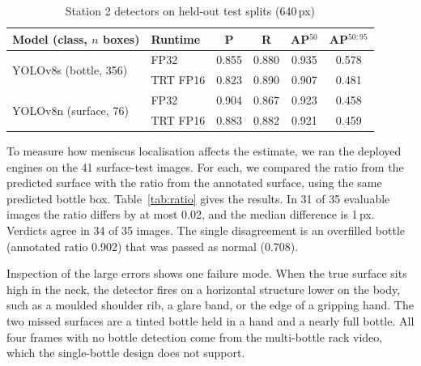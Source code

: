 \documentclass[conference]{IEEEtran}
\begin{document}
\begin{table}[t]
\caption{Station 2 detectors on held-out test splits (640\,px)}
\label{tab:fill}
\centering
\setlength{\tabcolsep}{3.5pt}
\begin{tabular}{llcccc}
\toprule
Model (class, $n$ boxes) & Runtime & P & R & AP$^{50}$ & AP$^{50:95}$\\
\midrule
\multirow{2}{*}{YOLOv8s (bottle, 356)} & FP32 & 0.855 & 0.880 & 0.935 & 0.578\\
 & TRT FP16 & 0.823 & 0.890 & 0.907 & 0.481\\
\multirow{2}{*}{YOLOv8n (surface, 76)} & FP32 & 0.904 & 0.867 & 0.923 & 0.458\\
 & TRT FP16 & 0.883 & 0.882 & 0.921 & 0.459\\
\bottomrule
\end{tabular}
\end{table}

To measure how meniscus localisation affects the estimate, we ran the deployed engines on the 41 surface-test images. For each, we compared the ratio from the predicted surface with the ratio from the annotated surface, using the same predicted bottle box. Table~\ref{tab:ratio} gives the results. In 31 of 35 evaluable images the ratio differs by at most 0.02, and the median difference is 1\,px. Verdicts agree in 34 of 35 images. The single disagreement is an overfilled bottle (annotated ratio 0.902) that was passed as normal (0.708).

Inspection of the large errors shows one failure mode. When the true surface sits high in the neck, the detector fires on a horizontal structure lower on the body, such as a moulded shoulder rib, a glare band, or the edge of a gripping hand. The two missed surfaces are a tinted bottle held in a hand and a nearly full bottle. All four frames with no bottle detection come from the multi-bottle rack video, which the single-bottle design does not support.

\begin{table}[t]
\caption{Fill-ratio error from meniscus localisation (41 test images, TRT FP16)}
\label{tab:ratio}
\centering
{}
\end{table}
\end{document}
